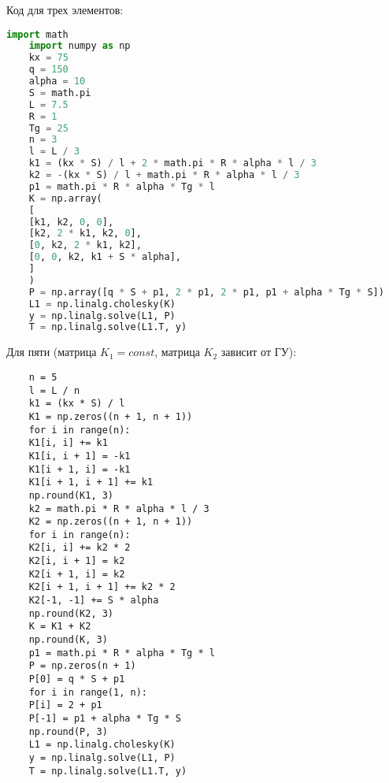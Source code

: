 \documentclass[a4paper, 12pt]{article}
\begin{document}
	Код для трех элементов:
	\begin{lstlisting}[language=Python]
	import math
	import numpy as np
	kx = 75
	q = 150
	alpha = 10
	S = math.pi
	L = 7.5
	R = 1
	Tg = 25
	n = 3
	l = L / 3
	k1 = (kx * S) / l + 2 * math.pi * R * alpha * l / 3
	k2 = -(kx * S) / l + math.pi * R * alpha * l / 3
	p1 = math.pi * R * alpha * Tg * l
	K = np.array(
	[
	[k1, k2, 0, 0],
	[k2, 2 * k1, k2, 0],
	[0, k2, 2 * k1, k2],
	[0, 0, k2, k1 + S * alpha],
	]
	)
	P = np.array([q * S + p1, 2 * p1, 2 * p1, p1 + alpha * Tg * S])
	L1 = np.linalg.cholesky(K)
	y = np.linalg.solve(L1, P)
	T = np.linalg.solve(L1.T, y)
	\end{lstlisting}
	
	\newpage
	Для пяти (матрица $K_1 = const$, матрица $K_2$ зависит от ГУ):
	\begin{lstlisting}
	n = 5
	l = L / n
	k1 = (kx * S) / l
	K1 = np.zeros((n + 1, n + 1))
	for i in range(n):
	K1[i, i] += k1
	K1[i, i + 1] = -k1
	K1[i + 1, i] = -k1
	K1[i + 1, i + 1] += k1
	np.round(K1, 3)
	k2 = math.pi * R * alpha * l / 3
	K2 = np.zeros((n + 1, n + 1))
	for i in range(n):
	K2[i, i] += k2 * 2
	K2[i, i + 1] = k2
	K2[i + 1, i] = k2
	K2[i + 1, i + 1] += k2 * 2
	K2[-1, -1] += S * alpha
	np.round(K2, 3)
	K = K1 + K2
	np.round(K, 3)
	p1 = math.pi * R * alpha * Tg * l
	P = np.zeros(n + 1)
	P[0] = q * S + p1
	for i in range(1, n):
	P[i] = 2 + p1
	P[-1] = p1 + alpha * Tg * S
	np.round(P, 3)
	L1 = np.linalg.cholesky(K)
	y = np.linalg.solve(L1, P)
	T = np.linalg.solve(L1.T, y)
	\end{lstlisting}
\end{document}
